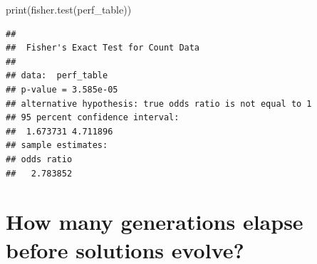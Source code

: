 \documentclass[
]{book}
\newenvironment{Shaded}{\begin{snugshade}}{\end{snugshade}}
\newcommand{\FunctionTok}[1]{\textcolor[rgb]{0.00,0.00,0.00}{#1}}
\newcommand{\NormalTok}[1]{#1}
\begin{document}
\begin{Shaded}
\begin{Highlighting}[]
\FunctionTok{print}\NormalTok{(}\FunctionTok{fisher.test}\NormalTok{(perf\_table))}
\end{Highlighting}
\end{Shaded}

\begin{verbatim}
## 
##  Fisher's Exact Test for Count Data
## 
## data:  perf_table
## p-value = 3.585e-05
## alternative hypothesis: true odds ratio is not equal to 1
## 95 percent confidence interval:
##  1.673731 4.711896
## sample estimates:
## odds ratio 
##   2.783852
\end{verbatim}

\hypertarget{how-many-generations-elapse-before-solutions-evolve-2}{%
\section{How many generations elapse before solutions evolve?}\label{how-many-generations-elapse-before-solutions-evolve-2}}
\end{document}
